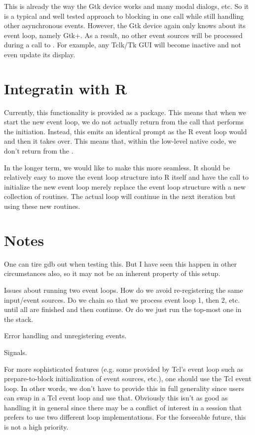 \documentclass{article}
\begin{document}
This is already the way the Gtk device works and many modal dialogs,
etc.  So it is a typical and well tested approach to blocking in one
call while still handling other asynchronous events.  However, the Gtk
device again only knows about its event loop, namely Gtk+.  As a
result, no other event sources will be processed during a call
to . For example, any Tclk/Tk GUI will become
inactive and not even update its display.


\section{Integratin with R}
Currently, this functionality is provided as a package.  This means
that when we start the new event loop, we do not actually return from
the  call that performs the initiation.  Instead, this
emits an identical prompt as the R event loop would and then it takes
over. This means that, within the low-level native code, we don't
return from the .

In the longer term, we would like to make this more seamless.  It
should be relatively easy to move the event loop structure into R
itself and have the call to initialize the new event loop merely
replace the event loop structure with a new collection of routines.
The actual loop will continue in the next iteration but using these
new routines.


\section{Notes}
One can tire gdb out when testing this.  But I have seen this happen
in other circumstances also, so it may not be an inherent property of
this setup.

Issues about running two event loops.  How do we avoid re-registering
the same input/event sources. Do we chain so that we process event
loop 1, then 2, etc. until all are finished and then continue.
Or do we just run the top-most one in the stack.

Error handling and unregistering events.

Signals.

For more sophisticated features (e.g. some provided by Tcl's event
loop such as prepare-to-block initialization of event sources, etc.),
one should use the Tcl event loop. In other words, we don't have to
provide this in full generality since users can swap in a Tcl event
loop and use that. Obviously this isn't as good as handling it in
general since there may be a conflict of interest in a session that
prefers to use two different loop implementations.  For the forseeable
future, this is not a high priority.
\end{document}
